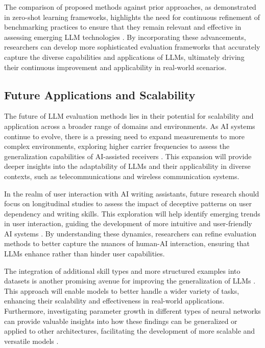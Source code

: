 The comparison of proposed methods against prior approaches, as demonstrated in zero-shot learning frameworks, highlights the need for continuous refinement of benchmarking practices to ensure that they remain relevant and effective in assessing emerging LLM technologies \cite{ramesh2021zero}. By incorporating these advancements, researchers can develop more sophisticated evaluation frameworks that accurately capture the diverse capabilities and applications of LLMs, ultimately driving their continuous improvement and applicability in real-world scenarios.



\subsection{Future Applications and Scalability} \label{subsec:Future Applications and Scalability}



The future of LLM evaluation methods lies in their potential for scalability and application across a broader range of domains and environments. As AI systems continue to evolve, there is a pressing need to expand measurements to more complex environments, exploring higher carrier frequencies to assess the generalization capabilities of AI-assisted receivers \cite{luostari2024adaptingrealityovertheairvalidation}. This expansion will provide deeper insights into the adaptability of LLMs and their applicability in diverse contexts, such as telecommunications and wireless communication systems.



In the realm of user interaction with AI writing assistants, future research should focus on longitudinal studies to assess the impact of deceptive patterns on user dependency and writing skills. This exploration will help identify emerging trends in user interaction, guiding the development of more intuitive and user-friendly AI systems \cite{benharrak2024deceptivepatternsintelligentinteractive}. By understanding these dynamics, researchers can refine evaluation methods to better capture the nuances of human-AI interaction, ensuring that LLMs enhance rather than hinder user capabilities.



The integration of additional skill types and more structured examples into datasets is another promising avenue for improving the generalization of LLMs \cite{zhou2024languageconditionedimitationlearningbase}. This approach will enable models to better handle a wider variety of tasks, enhancing their scalability and effectiveness in real-world applications. Furthermore, investigating parameter growth in different types of neural networks can provide valuable insights into how these findings can be generalized or applied to other architectures, facilitating the development of more scalable and versatile models \cite{morina2024growthparametersapproximatingrelu}.



